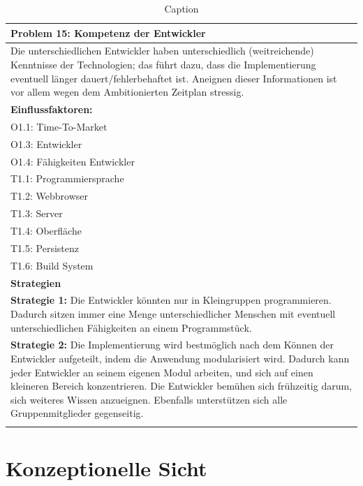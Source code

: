 \documentclass[enabledeprecatedfontcommands,fontsize=12pt,paper=a4,twoside]{scrartcl}
\begin{document}
\begin{table}[]
    \centering
    \begin{tabular}{|p{15cm}|}
    \hline
          \textbf{Problem 15:} Kompetenz der Entwickler
          \\ \hline
          Die unterschiedlichen Entwickler haben unterschiedlich (weitreichende) Kenntnisse der Technologien; das führt dazu, dass die Implementierung eventuell länger dauert/fehlerbehaftet ist. Aneignen dieser Informationen ist vor allem wegen dem Ambitionierten Zeitplan stressig.
          \\ \hline
          \textbf{Einflussfaktoren: } \\
          O1.1: Time-To-Market \\
          O1.3: Entwickler \\
          O1.4: Fähigkeiten Entwickler \\
          T1.1: Programmiersprache \\
          T1.2: Webbrowser \\
          T1.3: Server \\
          T1.4: Oberfläche \\
          T1.5: Persistenz \\
          T1.6: Build System\\
          \hline
          \textbf{Strategien} \\ \hline
         \textbf{Strategie 1:} Die Entwickler könnten nur in Kleingruppen programmieren. Dadurch sitzen immer eine Menge unterschiedlicher Menschen mit eventuell unterschiedlichen Fähigkeiten an einem Programmstück. \\
          \textbf{Strategie 2:} Die Implementierung wird bestmöglich nach dem Können der Entwickler aufgeteilt, indem die Anwendung modularisiert wird. Dadurch kann jeder Entwickler an seinem eigenen Modul arbeiten, und sich auf einen kleineren Bereich konzentrieren. Die Entwickler bemühen sich frühzeitig darum, sich weiteres Wissen anzueignen. Ebenfalls unterstützen sich alle Gruppenmitglieder gegenseitig.\\
          \\ \hline
    \end{tabular}
    \caption{Caption}
    \label{tab:my_label}
\end{table}


\section{Konzeptionelle Sicht}
\label{sec:konzeptionell}
\end{document}
